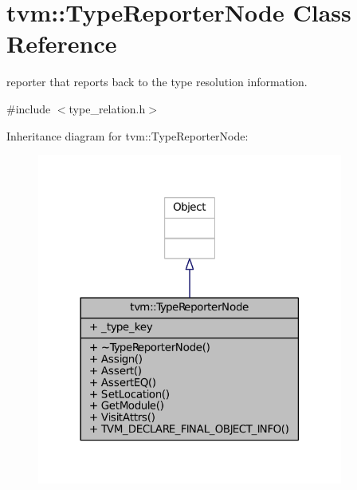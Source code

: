 \hypertarget{classtvm_1_1TypeReporterNode}{}\section{tvm\+:\+:Type\+Reporter\+Node Class Reference}
\label{classtvm_1_1TypeReporterNode}


reporter that reports back to the type resolution information.  




{\ttfamily \#include $<$type\+\_\+relation.\+h$>$}



Inheritance diagram for tvm\+:\+:Type\+Reporter\+Node\+:
\nopagebreak
\begin{figure}[H]
\begin{center}
\leavevmode
\includegraphics[width=285pt]{classtvm_1_1TypeReporterNode__inherit__graph}
\end{center}
\end{figure}


